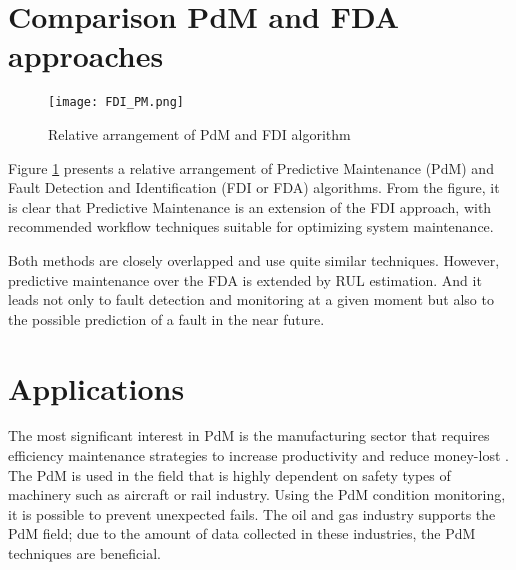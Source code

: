 \section{Comparison PdM and FDA approaches}

\begin{figure}[h!]
    \centering
    \texttt{[image: FDI\_PM.png]}
    \caption{Relative arrangement of PdM and FDI algorithm \cite{fdi_cern2}}
    \label{fig:fdi_pm}
\end{figure}


Figure \ref{fig:fdi_pm} presents a relative arrangement of Predictive Maintenance
(PdM) and Fault Detection and Identification (FDI or FDA) algorithms. From
the figure, it is clear that Predictive Maintenance is an extension of the
FDI approach, with recommended workflow techniques suitable for optimizing
system maintenance.


Both methods are closely overlapped and use quite similar techniques.
However, predictive maintenance over the FDA is extended by RUL estimation.
And it leads not only to fault detection and monitoring at a given moment
but also to the possible prediction of a fault in the near future. 

\section{Applications}\label{sec:applications}

The most significant interest in PdM is the manufacturing sector that
requires efficiency maintenance strategies to increase productivity and
reduce money-lost \cite{state_of_art_pdm}. The PdM is used in the field
that is highly dependent on safety types of machinery such as aircraft or
rail industry. Using the PdM condition monitoring, it is possible to
prevent unexpected fails. The oil and gas industry supports the PdM field;
due to the amount of data collected in these industries, the PdM techniques
are beneficial.
